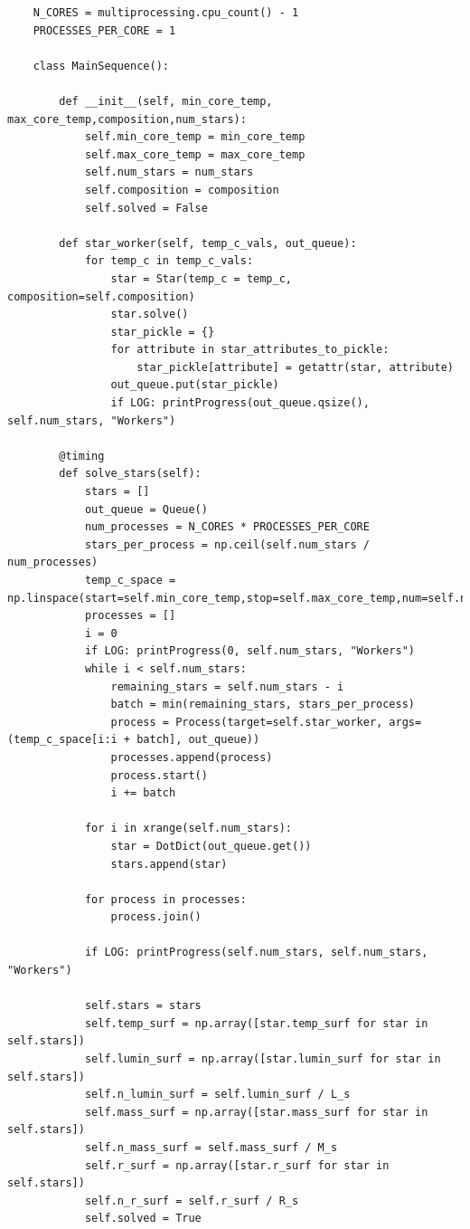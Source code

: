 \documentclass[11pt]{article}
\begin{document}
    \begin{lstlisting}
    N_CORES = multiprocessing.cpu_count() - 1
    PROCESSES_PER_CORE = 1

    class MainSequence():

        def __init__(self, min_core_temp, max_core_temp,composition,num_stars):
            self.min_core_temp = min_core_temp
            self.max_core_temp = max_core_temp
            self.num_stars = num_stars
            self.composition = composition
            self.solved = False

        def star_worker(self, temp_c_vals, out_queue):
            for temp_c in temp_c_vals:
                star = Star(temp_c = temp_c, composition=self.composition)
                star.solve()
                star_pickle = {}
                for attribute in star_attributes_to_pickle:
                    star_pickle[attribute] = getattr(star, attribute)
                out_queue.put(star_pickle)
                if LOG: printProgress(out_queue.qsize(), self.num_stars, "Workers")

        @timing
        def solve_stars(self):
            stars = []
            out_queue = Queue()
            num_processes = N_CORES * PROCESSES_PER_CORE
            stars_per_process = np.ceil(self.num_stars / num_processes)
            temp_c_space = np.linspace(start=self.min_core_temp,stop=self.max_core_temp,num=self.num_stars)
            processes = []
            i = 0
            if LOG: printProgress(0, self.num_stars, "Workers")
            while i < self.num_stars:
                remaining_stars = self.num_stars - i
                batch = min(remaining_stars, stars_per_process)
                process = Process(target=self.star_worker, args=(temp_c_space[i:i + batch], out_queue))
                processes.append(process)
                process.start()
                i += batch

            for i in xrange(self.num_stars):
                star = DotDict(out_queue.get())
                stars.append(star)

            for process in processes:
                process.join()

            if LOG: printProgress(self.num_stars, self.num_stars, "Workers")

            self.stars = stars
            self.temp_surf = np.array([star.temp_surf for star in self.stars])
            self.lumin_surf = np.array([star.lumin_surf for star in self.stars])
            self.n_lumin_surf = self.lumin_surf / L_s
            self.mass_surf = np.array([star.mass_surf for star in self.stars])
            self.n_mass_surf = self.mass_surf / M_s
            self.r_surf = np.array([star.r_surf for star in self.stars])
            self.n_r_surf = self.r_surf / R_s
            self.solved = True
    \end{lstlisting}
\end{document}

